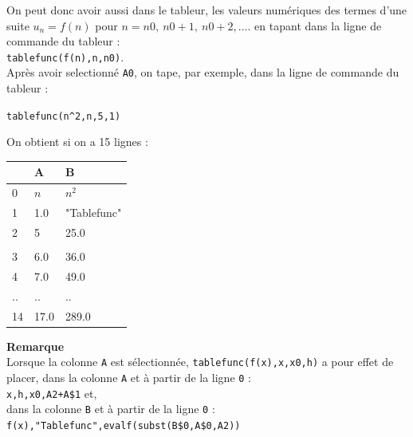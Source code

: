 \documentclass[a4paper,11pt]{book}
\begin{document}
On peut donc avoir aussi dans le tableur, les valeurs  num\'eriques des termes
 d'une suite $u_n=f(n)$ pour $n=n0,\ n0+1,\ n0+2,....$ en tapant dans la 
ligne de commande du tableur :\\
{\tt tablefunc(f(n),n,n0)}.\\
Apr\`es avoir selectionn\'e {\tt A0}, on tape, par exemple, dans la ligne de 
commande du tableur :\\
\begin{center}{\tt tablefunc(n\verb|^|2,n,5,1)}\end{center}
On obtient si on a 15 lignes :\\
\begin{center}{\tt \begin{tabular}{|l|l|l|}
\hline
 &A&B\\
\hline
0 & $n$ &$n^2$\\
\hline
1 &1.0&"Tablefunc"\\
\hline
2& 5&25.0\\
\\\hline
3 & 6.0 & 36.0\\
\hline
4 & 7.0 &49.0\\
\hline
.. &..&..\\
\hline
14 &17.0 &289.0\\
\hline
\end{tabular}}\end{center}
{\bf Remarque}\\
 Lorsque la colonne {\tt A} est s\'electionn\'ee, {\tt tablefunc(f(x),x,x0,h)}
 a pour effet de placer, dans la colonne {\tt A} et \`a partir de la ligne 
{\tt 0} :\\ {\tt x,h,x0,A2+A\$1} et,\\
dans la colonne {\tt B} et \`a partir de la ligne {\tt 0} :\\ 
{\tt f(x),"Tablefunc",evalf(subst(B\$0,A\$0,A2))}
\end{document}
